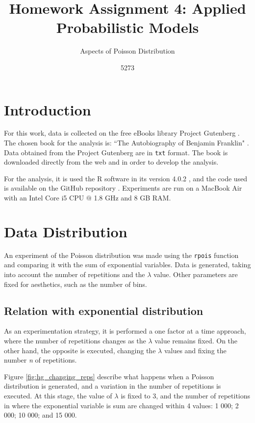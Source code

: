 \documentclass[10pt,leter,openany]{article}
\author{5273}
\title{Homework Assignment 4: Applied Probabilistic Models}
\subtitle{Aspects of Poisson Distribution}
\date{}
\begin{document}
	
\maketitle

\section{Introduction}
	
	For this work, data is collected on the free eBooks library Project Gutenberg \citep{gutenberg}. The chosen book for the analysis is: ``The Autobiography of Benjamin Franklin" \citep{franklin2007autobiography}. Data obtained from the Project Gutenberg are in \texttt{txt} format. The book is downloaded directly from the web and in order to develop the analysis.
	
	For the analysis, it is used the R software in its version 4.0.2 \citep{r}, and the code used is available on the GitHub repository \citep{github}. Experiments are run on a MacBook Air with an Intel Core i5 CPU $ @ $ 1.8 GHz and 8 GB RAM.
	
\section{Data Distribution}

	An experiment of the Poisson distribution was made using the \texttt{rpois} function and comparing it with the sum of exponential variables. Data is generated, taking into account the number of repetitions and the $\lambda$ value. Other parameters are fixed for aesthetics, such as the number of bins.
	
	\subsection{Relation with exponential distribution}
	As an experimentation strategy, it is performed a one factor at a time approach, where the number of repetitions changes as the $\lambda$ value remains fixed. On the other hand, the opposite is executed, changing the $\lambda$ values and fixing the number \textit{n} of repetitions.
	
	Figure \ref{fig:hg_changing_reps} describe what happens when a Poisson distribution is generated, and a variation in the number of repetitions is executed. At this stage, the value of $\lambda$ is fixed to 3, and the number of repetitions in where the exponential variable is sum are changed within 4 values: 1 000; 2 000; 10 000; and 15 000. 
	 
\end{document}
